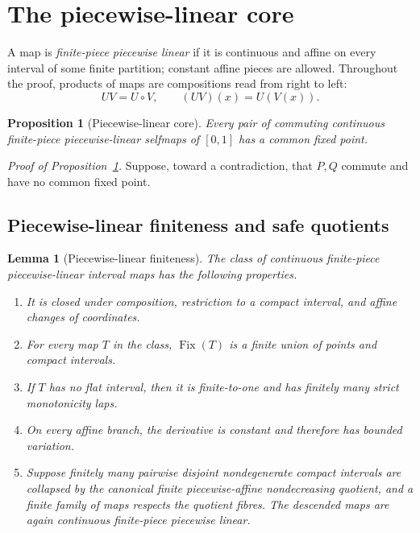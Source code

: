 \documentclass[11pt]{article}
\newtheorem{lemma}[theorem]{Lemma}
\newtheorem{proposition}[theorem]{Proposition}
\theoremstyle{definition}
\theoremstyle{remark}
\newcommand{\I}{[0,1]}
\newcommand{\Fix}{\operatorname{Fix}}
\begin{document}
\section{The piecewise-linear core}

A map is \emph{finite-piece piecewise linear} if it is continuous and affine
on every interval of some finite partition; constant affine pieces are
allowed.
Throughout the proof, products of maps are compositions read from right to
left:
\[
 UV=U\circ V,\qquad (UV)(x)=U(V(x)).
\]

\begin{proposition}[Piecewise-linear core]\label{prop:PL-core}
Every pair of commuting continuous finite-piece piecewise-linear selfmaps of
$\I$ has a common fixed point.
\end{proposition}

\par\noindent\textit{Proof of Proposition~\ref{prop:PL-core}.}\quad
Suppose, toward a contradiction, that $P,Q$ commute and have no common fixed
point.

\subsection{Piecewise-linear finiteness and safe quotients}

\begin{lemma}[Piecewise-linear finiteness]\label{lem:pl-finiteness}
The class of continuous finite-piece piecewise-linear interval maps has the
following properties.
\begin{enumerate}
\item It is closed under composition, restriction to a compact interval,
and affine changes of coordinates.
\item For every map $T$ in the class, $\Fix(T)$ is a finite union of points
and compact intervals.
\item If $T$ has no flat interval, then it is finite-to-one and has finitely
many strict monotonicity laps.
\item On every affine branch, the derivative is constant and therefore has
bounded variation.
\item Suppose finitely many pairwise disjoint nondegenerate compact intervals
are collapsed by the canonical finite piecewise-affine nondecreasing
quotient, and a finite family of maps respects the quotient fibres.  The
descended maps are again continuous finite-piece piecewise linear.
\end{enumerate}
\end{lemma}
\end{document}
